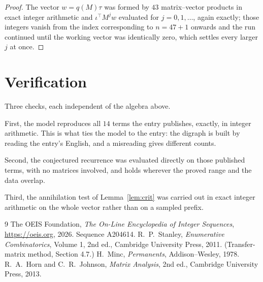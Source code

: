 \documentclass[11pt,a4paper]{article}
\theoremstyle{plain}
\theoremstyle{definition}
\begin{document}
\begin{proof}
The vector $w=q(M)\tau$ was formed by $43$ matrix--vector products in exact integer
arithmetic and $\iota^{\!\top}M^{j}w$ evaluated for $j=0,1,\dots$, again exactly; those
integers vanish from the index corresponding to $n=47+1$ onwards and the run continued
until the working vector was identically zero, which settles every larger $j$ at once.
\end{proof}

\section{Verification}

Three checks, each independent of the algebra above.

First, the model reproduces all $14$ terms the entry publishes, exactly, in integer
arithmetic. This is what ties the model to the entry: the digraph is built by reading the
entry's English, and a misreading gives different counts.

Second, the conjectured recurrence was evaluated directly on those published terms, with no
matrices involved, and holds wherever the proved range and the data overlap.

Third, the annihilation test of Lemma~\ref{lem:crit} was carried out in exact integer
arithmetic on the whole vector rather than on a sampled prefix.

\begin{thebibliography}{9}
 The OEIS Foundation, \emph{The On-Line Encyclopedia of Integer
Sequences}, \url{https://oeis.org}, 2026. Sequence A204614.
 R.~P.~Stanley, \emph{Enumerative Combinatorics}, Volume 1, 2nd ed.,
Cambridge University Press, 2011. (Transfer-matrix method, Section 4.7.)
 H.~Minc, \emph{Permanents}, Addison--Wesley, 1978.
 R.~A.~Horn and C.~R.~Johnson, \emph{Matrix Analysis}, 2nd ed., Cambridge
University Press, 2013.
\end{thebibliography}
\end{document}
